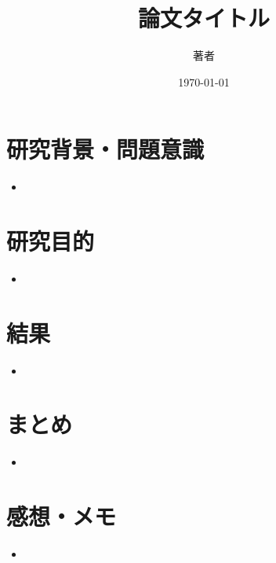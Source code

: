 \documentclass[a4paper,12pt]{jarticle}
\title{論文タイトル}
\author{著者}
\date{\today}
\begin{document}
\maketitle

\section*{研究背景・問題意識}
\begin{itemize}
    \item 
\end{itemize}

\section*{研究目的}
\begin{itemize}
    \item 
\end{itemize}

\section*{結果}
\begin{itemize}
    \item 
\end{itemize}



\section*{まとめ}
\begin{itemize}
    \item 
\end{itemize}

\section*{感想・メモ}
\begin{itemize}
    \item 
\end{itemize}
\end{document}
